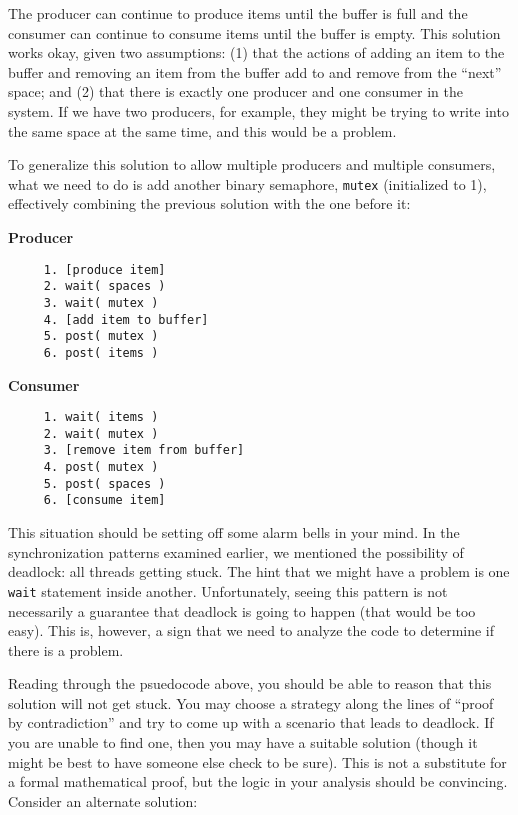 The producer can continue to produce items until the buffer is full and the consumer can continue to consume items until the buffer is empty. This solution works okay, given two assumptions: (1) that the actions of adding an item to the buffer and removing an item from the buffer add to and remove from the ``next'' space; and (2) that there is exactly one producer and one consumer in the system. If we have two producers, for example, they might be trying to write into the same space at the same time, and this would be a problem.

To generalize this solution to allow multiple producers and multiple consumers, what we need to do is add another binary semaphore, \texttt{mutex} (initialized to 1), effectively combining the previous solution with the one before it:

\begin{multicols}{2}
	\textbf{Producer}\vspace{-2em}
	\begin{verbatim}
	 1. [produce item]
	 2. wait( spaces )
	 3. wait( mutex )
	 4. [add item to buffer]
	 5. post( mutex )
	 6. post( items )
  \end{verbatim}
	\columnbreak
	\textbf{Consumer}\vspace{-2em}
	\begin{verbatim}
	 1. wait( items )
	 2. wait( mutex )
	 3. [remove item from buffer]
	 4. post( mutex )
	 5. post( spaces )
	 6. [consume item]
  \end{verbatim}
\end{multicols}
\vspace{-2em}

This situation should be setting off some alarm bells in your mind. In the synchronization patterns examined earlier, we mentioned the possibility of deadlock: all threads getting stuck. The hint that we might have a problem is one \texttt{wait} statement inside another. Unfortunately, seeing this pattern is not necessarily a guarantee that deadlock is going to happen (that would be too easy). This is, however, a sign that we need to analyze the code to determine if there is a problem.

Reading through the psuedocode above, you should be able to reason that this solution will not get stuck. You may choose a strategy along the lines of ``proof by contradiction'' and try to come up with a scenario that leads to deadlock. If you are unable to find one, then you may have a suitable solution (though it might be best to have someone else check to be sure). This is not a substitute for a formal mathematical proof, but the logic in your analysis should be convincing. Consider an alternate solution:

